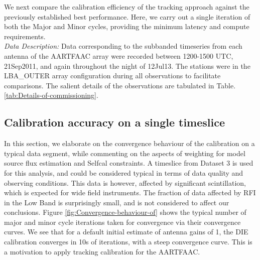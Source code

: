 \documentclass{aa}
\begin{document}
We next compare the calibration  efficiency of the tracking approach against the
previously established best  performance. Here, we carry out  a single iteration
of both  the Major and Minor  cycles, providing the minimum  latency and compute
requirements.\\  \emph{Data Description:  }Data corresponding  to  the subbanded
timeseries  from  each antenna  of  the  AARTFAAC  array were  recorded  between
1200-1500  UTC,  21Sep2011, and  again  throughout  the  night of  12Jul13.  The
stations were in  the LBA\_OUTER array configuration during  all observations to
facilitate comparisons. The salient details of the observations are tabulated in
Table. \ref{tab:Details-of-commissioning}.

\begin{table}[tbh]

\caption{\label{tab:Details-of-commissioning}Details of commissioning observations
carried out with the AARTFAAC }
\end{table}



\subsection{Calibration accuracy on a single timeslice}

In this section, we elaborate on the convergence behaviour of the calibration on
a typical data  segment, while commenting on the aspects  of weighting for model
source flux estimation  and Selfcal constraints.  A timeslice  from Dataset 3 is
used for this analysis, and could be considered typical in terms of data quality
and  observing  conditions.   This  data  is however,  affected  by  significant
scintillation, which  is expected  for wide field  instruments. The  fraction of
data    affected    by    RFI     in    the    Low    Band    is    surprisingly
small\citep{offringa2012lofar},   and   is   not   considered  to   affect   our
conclusions. Figure \ref{fig:Convergence-behaviour-of}  shows the typical number
of major and minor cycle  iterations taken for convergence via their convergence
curves. We see  that for a default  initial estimate of antenna gains  of 1, the
DIE  calibration  converges in  10s  of  iterations,  with a  steep  convergence
curve. This is a motivation to apply tracking calibration for the AARTFAAC.
\end{document}
